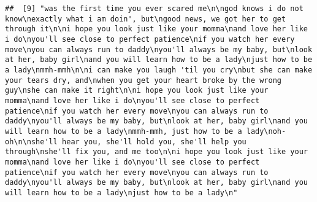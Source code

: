 \documentclass[]{article}
\begin{document}
\begin{verbatim}
##  [9] "was the first time you ever scared me\n\ngod knows i do not know\nexactly what i am doin', but\ngood news, we got her to get through it\n\ni hope you look just like your momma\nand love her like i do\nyou'll see close to perfect patience\nif you watch her every move\nyou can always run to daddy\nyou'll always be my baby, but\nlook at her, baby girl\nand you will learn how to be a lady\njust how to be a lady\nmmh-mmh\n\ni can make you laugh 'til you cry\nbut she can make your tears dry, and\nwhen you get your heart broke by the wrong guy\nshe can make it right\n\ni hope you look just like your momma\nand love her like i do\nyou'll see close to perfect patience\nif you watch her every move\nyou can always run to daddy\nyou'll always be my baby, but\nlook at her, baby girl\nand you will learn how to be a lady\nmmh-mmh, just how to be a lady\noh-oh\n\nshe'll hear you, she'll hold you, she'll help you through\nshe'll fix you, and me too\n\ni hope you look just like your momma\nand love her like i do\nyou'll see close to perfect patience\nif you watch her every move\nyou can always run to daddy\nyou'll always be my baby, but\nlook at her, baby girl\nand you will learn how to be a lady\njust how to be a lady\n"                                                                                                                                                                                                                                                                                                                                                                                                                                                                                                                                                                                                                                                                                                                                                                                                                                                                                                                                                                                                                                                                                                                                                                                                                                                                                                                                                                                                                                                                                                                                                                                                                                                                                                           

\end{verbatim}
\end{document}
